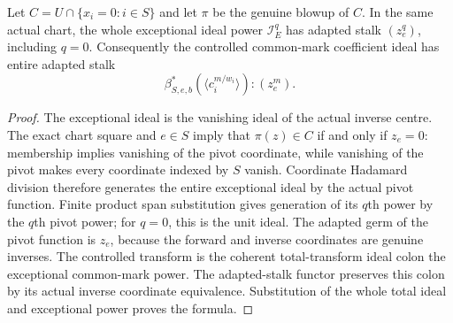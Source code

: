 \begin{lemma}
\label{hir:actual-centre-weighted-controlled-stalk}
\leanok
Let $C=U\cap\{x_i=0:i\in S\}$ and let $\pi$ be the genuine blowup of $C$. In the same actual chart, the whole exceptional ideal power $\mathcal I_E^q$ has adapted stalk $(z_e^q)$, including $q=0$. Consequently the controlled common-mark coefficient ideal has entire adapted stalk
\[
 \beta_{S,e,b}^*(\langle c_i^{m/w_i}\rangle):(z_e^m).
\]
\end{lemma}
\begin{proof}
The exceptional ideal is the vanishing ideal of the actual inverse centre. The exact chart square and $e\in S$ imply that $\pi(z)\in C$ if and only if $z_e=0$: membership implies vanishing of the pivot coordinate, while vanishing of the pivot makes every coordinate indexed by $S$ vanish. Coordinate Hadamard division therefore generates the entire exceptional ideal by the actual pivot function. Finite product span substitution gives generation of its $q$th power by the $q$th pivot power; for $q=0$, this is the unit ideal. The adapted germ of the pivot function is $z_e$, because the forward and inverse coordinates are genuine inverses. The controlled transform is the coherent total-transform ideal colon the exceptional common-mark power. The adapted-stalk functor preserves this colon by its actual inverse coordinate equivalence. Substitution of the whole total ideal and exceptional power proves the formula.
\end{proof}


